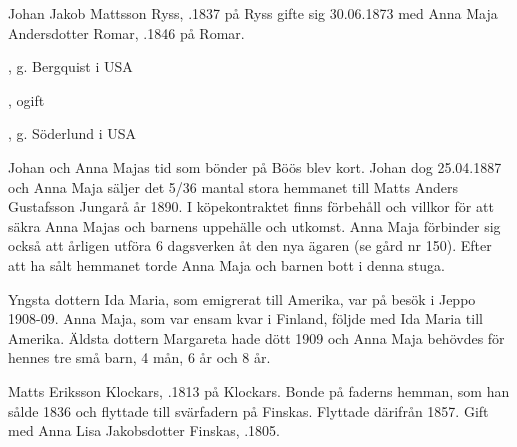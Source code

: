 %
Johan Jakob Mattsson Ryss, .1837 på Ryss gifte sig 30.06.1873 med Anna Maja Andersdotter Romar, .1846 på Romar.
\begin{jhchildren}
  \item {}
  \item {}, g. Bergquist i USA
  \item {}, ogift
  \item {}
  \item {}
  \item {}, g. Söderlund i USA
\end{jhchildren}
Johan och Anna Majas tid som bönder på Böös blev kort. Johan dog 25.04.1887 och Anna Maja säljer det 5/36 mantal stora hemmanet till Matts Anders Gustafsson Jungarå år 1890. I köpekontraktet finns förbehåll och villkor för att säkra Anna Majas och barnens uppehälle och utkomst. Anna Maja förbinder sig också att årligen utföra 6 dagsverken åt den nya ägaren (se gård nr 150). Efter att ha sålt hemmanet torde Anna Maja och barnen bott i denna stuga.

Yngsta dottern Ida Maria, som emigrerat till Amerika, var på besök i Jeppo 1908-09. Anna Maja, som var ensam kvar i Finland, följde med 	Ida Maria till Amerika. Äldsta dottern Margareta hade dött 1909 och Anna Maja behövdes för hennes tre små barn, 4 mån, 6 år och 8 år.


%
Matts Eriksson Klockars, .1813 på Klockars. Bonde på faderns hemman, som han sålde 1836 och flyttade till svärfadern på Finskas. Flyttade därifrån 1857. Gift med Anna Lisa Jakobsdotter Finskas, .1805.
\begin{jhchildren}
  \item {}
  \item {}
  \item {}
\end{jhchildren}


